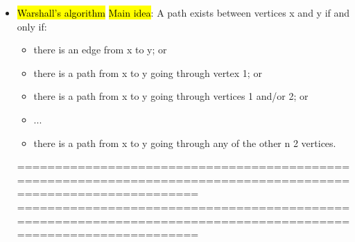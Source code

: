 \documentclass{article}
\begin{document}
\begin{itemize}
\item \hl{Warshall’s algorithm}
\hl{Main idea}: A path exists between vertices x and y if and only if:
\begin{itemize}
\item there is an edge from x to y; or
\item there is a path from x to y going through vertex 1; or
\item there is a path from x to y going through vertices 1 and/or 2; or
\item ...
\item there is a path from x to y going through any of the other n  2
vertices.
\end{itemize}

================================================================================================================
\newpage
================================================================================================================\\


\end{itemize}
\end{document}
